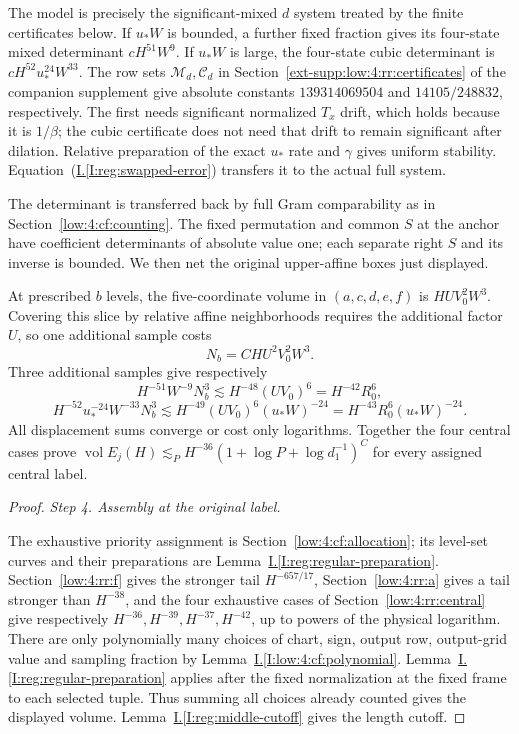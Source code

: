 \documentclass[11pt]{amsart}
\theoremstyle{definition}
\theoremstyle{remark}
\DeclareMathOperator{\vol}{vol}
\numberwithin{equation}{section}
\newcommand{\partIref}[1]{\hyperref[I:#1]{I.\ref*{I:#1}}}
\newcommand{\partIeqref}[1]{\textup{(\partIref{#1})}}
\begin{document}
The model is precisely the significant-mixed $d$ system treated by the finite certificates below. If $u_*W$ is bounded, a further fixed fraction gives its four-state mixed determinant $cH^{51}W^9$. If $u_*W$ is large, the four-state cubic determinant is $cH^{52}u_*^{24}W^{33}$. The row sets $\mathcal M_d,\mathcal C_d$ in Section~\ref{ext-supp:low:4:rr:certificates} of the companion supplement give absolute constants $139314069504$ and $14105/248832$, respectively. The first needs significant normalized $T_x$ drift, which holds because it is $1/\beta$; the cubic certificate does not need that drift to remain significant after dilation. Relative preparation of the exact $u_*$ rate and $\gamma$ gives uniform stability. Equation~\partIeqref{reg:swapped-error} transfers it to the actual full system.

The determinant is transferred back by full Gram comparability as in Section~\ref{low:4:cf:counting}. The fixed permutation and common $S$ at the anchor have coefficient determinants of absolute value one; each separate right $S$ and its inverse is bounded. We then net the original upper-affine boxes just displayed. 

At prescribed $b$ levels, the five-coordinate volume in $(a,c,d,e,f)$ is $HU V_0^2W^3$. Covering this slice by relative affine neighborhoods requires the additional factor $U$, so one additional sample costs
\[
N_b=CHU^2V_0^2W^3.
\]
Three additional samples give respectively
\[
H^{-51}W^{-9}N_b^3\lesssim H^{-48}(UV_0)^6=H^{-42}R_0^6,
\]
\[
H^{-52}u_*^{-24}W^{-33}N_b^3
\lesssim H^{-49}(UV_0)^6(u_*W)^{-24}
=H^{-43}R_0^6(u_*W)^{-24}.
\]
All displacement sums converge or cost only logarithms. Together the four central cases prove $\vol E_j(H)\lesssim_P H^{-36}(1+\log P+\log d_1^{-1})^C$ for every assigned central label.

\begin{proof}
\par\smallskip\noindent\textit{Step 4. Assembly at the original label.}\par\nobreak\smallskip

The exhaustive priority assignment is Section~\ref{low:4:cf:allocation}; its level-set curves and their preparations are Lemma~\partIref{reg:regular-preparation}. Section~\ref{low:4:rr:f} gives the stronger tail $H^{-657/17}$, Section~\ref{low:4:rr:a} gives a tail stronger than $H^{-38}$, and the four exhaustive cases of Section~\ref{low:4:rr:central} give respectively $H^{-36},H^{-39},H^{-37},H^{-42}$, up to powers of the physical logarithm. There are only polynomially many choices of chart, sign, output row, output-grid value and sampling fraction by Lemma~\partIref{low:4:cf:polynomial}. Lemma~\partIref{reg:regular-preparation} applies after the fixed normalization at the fixed frame to each selected tuple. Thus summing all choices already counted gives the displayed volume. Lemma~\partIref{reg:middle-cutoff} gives the length cutoff. 
\end{proof}
\end{document}

